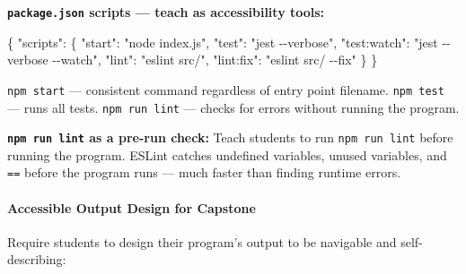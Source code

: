 \documentclass[
  justified,
  openright,
]{tufte-book}
\let\subsection\paragraph
\let\paragraph\paragraph
\newcommand{\StringTok}[1]{\textcolor{CodeString}{#1}}              %
\newcommand{\CodeFuncTok}[1]{\textcolor{CodeKeyword}{#1}}           %
\newcommand{\CodeTypeTok}[1]{\textcolor{CodeType}{#1}}              %
\newenvironment{Shaded}{%
  \begin{mdframed}[style=TufteCode]%
}{%
  \end{mdframed}%
}
\let\subsection\paragraph
\let\paragraph\paragraph
\begin{document}
\textbf{\texttt{package.json} scripts --- teach as accessibility tools:}

\begin{Shaded}
\begin{Highlighting}[]
\CodeFuncTok{\{}
  \CodeTypeTok{"scripts"}\CodeFuncTok{:} \CodeFuncTok{\{}
    \CodeTypeTok{"start"}\CodeFuncTok{:} \StringTok{"node index.js"}\CodeFuncTok{,}
    \CodeTypeTok{"test"}\CodeFuncTok{:} \StringTok{"jest {-}{-}verbose"}\CodeFuncTok{,}
    \CodeTypeTok{"test:watch"}\CodeFuncTok{:} \StringTok{"jest {-}{-}verbose {-}{-}watch"}\CodeFuncTok{,}
    \CodeTypeTok{"lint"}\CodeFuncTok{:} \StringTok{"eslint src/"}\CodeFuncTok{,}
    \CodeTypeTok{"lint:fix"}\CodeFuncTok{:} \StringTok{"eslint src/ {-}{-}fix"}
  \CodeFuncTok{\}}
\CodeFuncTok{\}}
\end{Highlighting}
\end{Shaded}

\texttt{npm\ start} --- consistent command regardless of entry point
filename. \texttt{npm\ test} --- runs all tests. \texttt{npm\ run\ lint}
--- checks for errors without running the program.

\textbf{\texttt{npm\ run\ lint} as a pre-run check:} Teach students to
run \texttt{npm\ run\ lint} before running the program. ESLint catches
undefined variables, unused variables, and \texttt{==} before the
program runs --- much faster than finding runtime errors.

\subsection{Accessible Output Design for
Capstone}\label{accessible-output-design-for-capstone}

Require students to design their program's output to be navigable and
self-describing:
\end{document}
